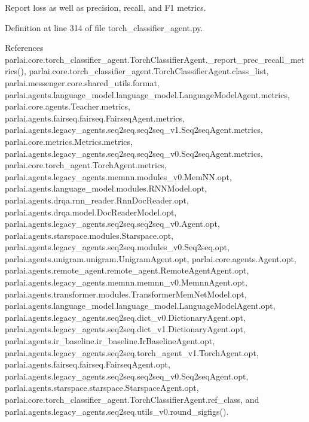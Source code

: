 \begin{DoxyVerb}Report loss as well as precision, recall, and F1 metrics.\end{DoxyVerb}
 

Definition at line 314 of file torch\+\_\+classifier\+\_\+agent.\+py.



References parlai.\+core.\+torch\+\_\+classifier\+\_\+agent.\+Torch\+Classifier\+Agent.\+\_\+report\+\_\+prec\+\_\+recall\+\_\+metrics(), parlai.\+core.\+torch\+\_\+classifier\+\_\+agent.\+Torch\+Classifier\+Agent.\+class\+\_\+list, parlai.\+messenger.\+core.\+shared\+\_\+utils.\+format, parlai.\+agents.\+language\+\_\+model.\+language\+\_\+model.\+Language\+Model\+Agent.\+metrics, parlai.\+core.\+agents.\+Teacher.\+metrics, parlai.\+agents.\+fairseq.\+fairseq.\+Fairseq\+Agent.\+metrics, parlai.\+agents.\+legacy\+\_\+agents.\+seq2seq.\+seq2seq\+\_\+v1.\+Seq2seq\+Agent.\+metrics, parlai.\+core.\+metrics.\+Metrics.\+metrics, parlai.\+agents.\+legacy\+\_\+agents.\+seq2seq.\+seq2seq\+\_\+v0.\+Seq2seq\+Agent.\+metrics, parlai.\+core.\+torch\+\_\+agent.\+Torch\+Agent.\+metrics, parlai.\+agents.\+legacy\+\_\+agents.\+memnn.\+modules\+\_\+v0.\+Mem\+N\+N.\+opt, parlai.\+agents.\+language\+\_\+model.\+modules.\+R\+N\+N\+Model.\+opt, parlai.\+agents.\+drqa.\+rnn\+\_\+reader.\+Rnn\+Doc\+Reader.\+opt, parlai.\+agents.\+drqa.\+model.\+Doc\+Reader\+Model.\+opt, parlai.\+agents.\+legacy\+\_\+agents.\+seq2seq.\+seq2seq\+\_\+v0.\+Agent.\+opt, parlai.\+agents.\+starspace.\+modules.\+Starspace.\+opt, parlai.\+agents.\+legacy\+\_\+agents.\+seq2seq.\+modules\+\_\+v0.\+Seq2seq.\+opt, parlai.\+agents.\+unigram.\+unigram.\+Unigram\+Agent.\+opt, parlai.\+core.\+agents.\+Agent.\+opt, parlai.\+agents.\+remote\+\_\+agent.\+remote\+\_\+agent.\+Remote\+Agent\+Agent.\+opt, parlai.\+agents.\+legacy\+\_\+agents.\+memnn.\+memnn\+\_\+v0.\+Memnn\+Agent.\+opt, parlai.\+agents.\+transformer.\+modules.\+Transformer\+Mem\+Net\+Model.\+opt, parlai.\+agents.\+language\+\_\+model.\+language\+\_\+model.\+Language\+Model\+Agent.\+opt, parlai.\+agents.\+legacy\+\_\+agents.\+seq2seq.\+dict\+\_\+v0.\+Dictionary\+Agent.\+opt, parlai.\+agents.\+legacy\+\_\+agents.\+seq2seq.\+dict\+\_\+v1.\+Dictionary\+Agent.\+opt, parlai.\+agents.\+ir\+\_\+baseline.\+ir\+\_\+baseline.\+Ir\+Baseline\+Agent.\+opt, parlai.\+agents.\+legacy\+\_\+agents.\+seq2seq.\+torch\+\_\+agent\+\_\+v1.\+Torch\+Agent.\+opt, parlai.\+agents.\+fairseq.\+fairseq.\+Fairseq\+Agent.\+opt, parlai.\+agents.\+legacy\+\_\+agents.\+seq2seq.\+seq2seq\+\_\+v0.\+Seq2seq\+Agent.\+opt, parlai.\+agents.\+starspace.\+starspace.\+Starspace\+Agent.\+opt, parlai.\+core.\+torch\+\_\+classifier\+\_\+agent.\+Torch\+Classifier\+Agent.\+ref\+\_\+class, and parlai.\+agents.\+legacy\+\_\+agents.\+seq2seq.\+utils\+\_\+v0.\+round\+\_\+sigfigs().

